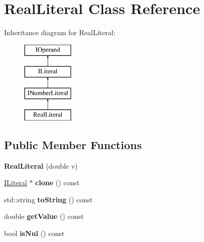 \hypertarget{class_real_literal}{}\section{Real\+Literal Class Reference}
\label{class_real_literal}
Inheritance diagram for Real\+Literal\+:\begin{figure}[H]
\begin{center}
\leavevmode
\includegraphics[height=4.000000cm]{class_real_literal}
\end{center}
\end{figure}
\subsection*{Public Member Functions}
\begin{DoxyCompactItemize}
\item 
{\bfseries Real\+Literal} (double v)\hypertarget{class_real_literal_aa22a4252b39d0aade8a4d74afa746e2c}{}\label{class_real_literal_aa22a4252b39d0aade8a4d74afa746e2c}

\item 
\hyperlink{class_i_literal}{I\+Literal} $\ast$ {\bfseries clone} () const \hypertarget{class_real_literal_a39ff05b95f76ef502c24b6fc69677717}{}\label{class_real_literal_a39ff05b95f76ef502c24b6fc69677717}

\item 
std\+::string {\bfseries to\+String} () const \hypertarget{class_real_literal_a6b111b0ac8dab29935f5082c794665bb}{}\label{class_real_literal_a6b111b0ac8dab29935f5082c794665bb}

\item 
double {\bfseries get\+Value} () const \hypertarget{class_real_literal_a70b27a2fbadaa180583338dea4332618}{}\label{class_real_literal_a70b27a2fbadaa180583338dea4332618}

\item 
bool {\bfseries is\+Nul} () const \hypertarget{class_real_literal_ad153aee3a05d5187216fb07c8fb859f9}{}\label{class_real_literal_ad153aee3a05d5187216fb07c8fb859f9}

\end{DoxyCompactItemize}
